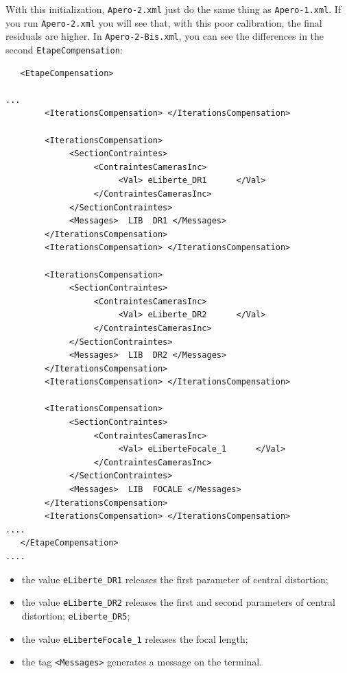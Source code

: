 With this initialization,  {\tt Apero-2.xml} just do the same thing as {\tt Apero-1.xml}.
If you run {\tt Apero-2.xml} you will see that, with this poor calibration, the final residuals are higher.
In  {\tt Apero-2-Bis.xml}, you can see the differences in the second  {\tt EtapeCompensation}:

{\scriptsize
\begin{verbatim}
   <EtapeCompensation>

...
        <IterationsCompensation> </IterationsCompensation>

        <IterationsCompensation>
             <SectionContraintes>
                  <ContraintesCamerasInc>
                       <Val> eLiberte_DR1      </Val>
                  </ContraintesCamerasInc>
             </SectionContraintes>
             <Messages>  LIB  DR1 </Messages>
        </IterationsCompensation>
        <IterationsCompensation> </IterationsCompensation>

        <IterationsCompensation>
             <SectionContraintes>
                  <ContraintesCamerasInc>
                       <Val> eLiberte_DR2      </Val>
                  </ContraintesCamerasInc>
             </SectionContraintes>
             <Messages>  LIB  DR2 </Messages>
        </IterationsCompensation>
        <IterationsCompensation> </IterationsCompensation>

        <IterationsCompensation>
             <SectionContraintes>
                  <ContraintesCamerasInc>
                       <Val> eLiberteFocale_1      </Val>
                  </ContraintesCamerasInc>
             </SectionContraintes>
             <Messages>  LIB  FOCALE </Messages>
        </IterationsCompensation>
        <IterationsCompensation> </IterationsCompensation>
....
   </EtapeCompensation>
....

\end{verbatim}
}



\begin{itemize}
   \item the value {\tt eLiberte\_DR1} releases the first  parameter of central distortion;

   \item the value {\tt eLiberte\_DR2} releases the first and second parameters of central distortion;
          {\tt eLiberte\_DR5};

   \item the value {\tt eLiberteFocale\_1} releases the focal length;
   \item the tag  {\tt <Messages>} generates a message on the terminal.

\end{itemize}

